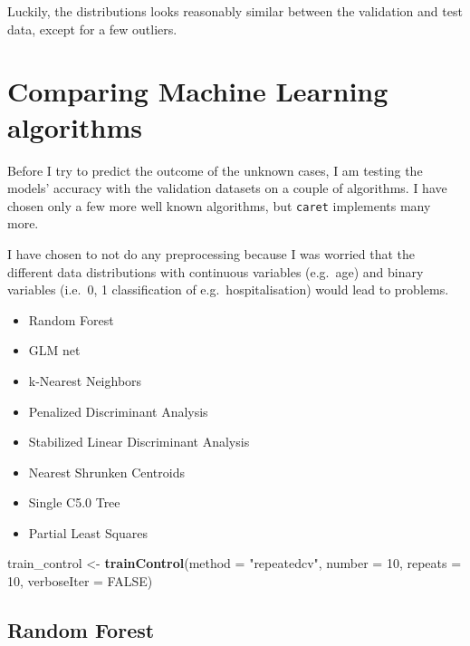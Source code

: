 \documentclass[]{book}
\newenvironment{Shaded}{\begin{snugshade}}{\end{snugshade}}
\newcommand{\DataTypeTok}[1]{\textcolor[rgb]{0.13,0.29,0.53}{#1}}
\newcommand{\DecValTok}[1]{\textcolor[rgb]{0.00,0.00,0.81}{#1}}
\newcommand{\KeywordTok}[1]{\textcolor[rgb]{0.13,0.29,0.53}{\textbf{#1}}}
\newcommand{\NormalTok}[1]{#1}
\newcommand{\OtherTok}[1]{\textcolor[rgb]{0.56,0.35,0.01}{#1}}
\newcommand{\StringTok}[1]{\textcolor[rgb]{0.31,0.60,0.02}{#1}}
\providecommand{\tightlist}{%
  \setlength{\itemsep}{0pt}\setlength{\parskip}{0pt}}
\begin{document}
Luckily, the distributions looks reasonably similar between the validation and test data, except for a few outliers.

\hypertarget{comparing-machine-learning-algorithms}{%
\section{Comparing Machine Learning algorithms}\label{comparing-machine-learning-algorithms}}

Before I try to predict the outcome of the unknown cases, I am testing the models' accuracy with the validation datasets on a couple of algorithms. I have chosen only a few more well known algorithms, but \texttt{caret} implements many more.

I have chosen to not do any preprocessing because I was worried that the different data distributions with continuous variables (e.g.~age) and binary variables (i.e.~0, 1 classification of e.g.~hospitalisation) would lead to problems.

\begin{itemize}
\tightlist
\item
  Random Forest
\item
  GLM net
\item
  k-Nearest Neighbors
\item
  Penalized Discriminant Analysis
\item
  Stabilized Linear Discriminant Analysis
\item
  Nearest Shrunken Centroids
\item
  Single C5.0 Tree
\item
  Partial Least Squares
\end{itemize}

\begin{Shaded}
\begin{Highlighting}[]
\NormalTok{train_control <-}\StringTok{ }\KeywordTok{trainControl}\NormalTok{(}\DataTypeTok{method =} \StringTok{"repeatedcv"}\NormalTok{, }
                              \DataTypeTok{number =} \DecValTok{10}\NormalTok{, }
                              \DataTypeTok{repeats =} \DecValTok{10}\NormalTok{, }
                              \DataTypeTok{verboseIter =} \OtherTok{FALSE}\NormalTok{)}
\end{Highlighting}
\end{Shaded}

\hypertarget{random-forest-1}{%
\subsection{Random Forest}\label{random-forest-1}}
\end{document}
